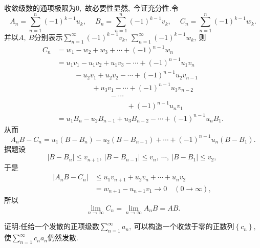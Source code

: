 	\begin{solution}
		收敛级数的通项极限为$0$,\ 故必要性显然,\ 今证充分性.令
		$$A_n=\sum\limits_{n=1}^{n}(-1)^{k-1}u_k,\ \quad B_n=\sum\limits_{n=1}^{n}(-1)^{k-1}v_k,\ \quad C_n=\sum\limits_{n=1}^{n}(-1)^{k-1}w_k.$$
		并以$A,\ B$分别表示$\sum\limits_{n=1}^{\infty}(-1)^{k-1}v_k,\ \sum\limits_{n=1}^{\infty}(-1)^{k-1}w_k,\ $则
		\begin{align*}
			C_n&=w_1-w_2+w_3+\cdots+(-1)^{n-1}w_n\\
			&=u_1v_1-u_1v_2+u_1v_3-\cdots+(-1)^{n-1}u_1v_n\\
			&\qquad\ \ -u_2v_1+u_2v_2-\cdots+(-1)^{n-1}u_2v_{n-1}\\
			&\qquad\ \ \qquad\ \ +u_3v_1-\cdots+(-1)^{n-1}u_3v_{n-2}\\
			&\qquad\ \ \qquad\ \ \qquad\ \ -\cdots\\
			&\qquad\ \ \qquad\ \ \qquad\ \ \qquad\ \ +(-1)^{n-1}u_nv_1\\
			&=u_1B_n-u_2B_{n-1}+u_3B_{n-2}-\cdots+(-1)^{n-1}u_nB_1.
		\end{align*}
		从而
		$$A_nB-C_n=u_1(B-B_n)-u_2(B-B_{n-1})+\cdots+(-1)^{n-1}u_n(B-B_1).$$
		据题设
		$$|B-B_n|\le v_{n+1},\ |B-B_{n-1}|\le v_n,\ \cdots,\ |B-B_1|\le v_2,\ $$
		于是
		\begin{align*}
			|A_nB-C_n|&\le u_1v_{n+1}+u_2v_n+\cdots+u_nv_2\\
			&=w_{n+1}-u_{n+1}v_1\rightarrow0\quad(0\rightarrow\infty),\ 
		\end{align*}
		所以
		$$\lim\limits_{n\rightarrow\infty}C_n=\lim\limits_{n\rightarrow\infty}A_nB=AB.$$ 
	\end{solution}
	\newpage
	\begin{problem}
		证明:任给一个发散的正项级数$\sum\limits_{n=1}^{\infty}a_n,\ $可以构造一个收敛于零的正数列$\left\{c_n\right\},\ $使$\sum\limits_{n=1}^{\infty}c_na_n$仍然发散.
	\end{problem}
